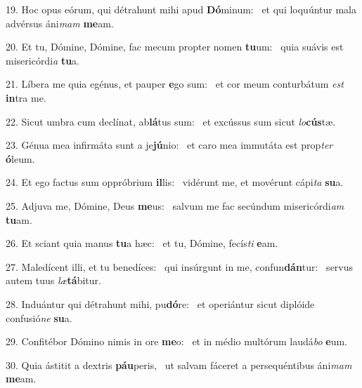 19. Hoc opus eórum, qui détrahunt mihi apud \textbf{Dó}minum: \ast\  et qui loquúntur mala advérsus áni\textit{mam} \textbf{me}am.\

20. Et tu, Dómine, Dómine, fac mecum propter nomen \textbf{tu}um: \ast\  quia suávis est misericórdi\textit{a} \textbf{tu}a.\

21. Líbera me quia egénus, et pauper \textbf{e}go sum: \ast\  et cor meum conturbátum \textit{est} \textbf{in}tra me.\

22. Sicut umbra cum declínat, ab\textbf{lá}tus sum: \ast\  et excússus sum sicut \textit{lo}\textbf{cús}tæ.\

23. Génua mea infirmáta sunt a je\textbf{jú}nio: \ast\  et caro mea immutáta est prop\textit{ter} \textbf{ó}leum.\

24. Et ego factus sum oppróbrium \textbf{il}lis: \ast\  vidérunt me, et movérunt cápi\textit{ta} \textbf{su}a.\

25. Adjuva me, Dómine, Deus \textbf{me}us: \ast\  salvum me fac secúndum misericórdi\textit{am} \textbf{tu}am.\

26. Et sciant quia manus \textbf{tu}a hæc: \ast\  et tu, Dómine, fecís\textit{ti} \textbf{e}am.\

27. Maledícent illi, et tu benedíces: \dag\  qui insúrgunt in me, confun\textbf{dán}tur: \ast\  servus autem tuus \textit{læ}\textbf{tá}bitur.\

28. Induántur qui détrahunt mihi, pu\textbf{dó}re: \ast\  et operiántur sicut diplóide confusió\textit{ne} \textbf{su}a.\

29. Confitébor Dómino nimis in ore \textbf{me}o: \ast\  et in médio multórum laudá\textit{bo} \textbf{e}um.\

30. Quia ástitit a dextris \textbf{páu}peris, \ast\  ut salvam fáceret a persequéntibus áni\textit{mam} \textbf{me}am.\

